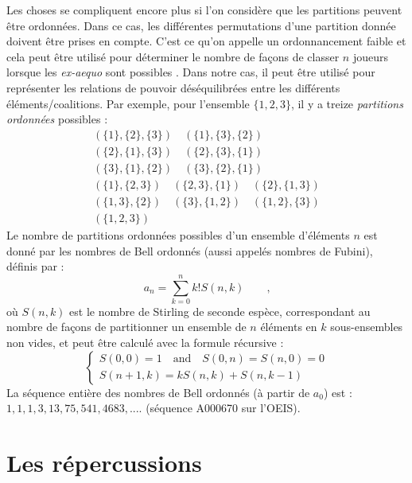Les choses se compliquent encore plus si l'on considère que les partitions peuvent être ordonnées. Dans ce cas, les différentes permutations d'une partition donnée doivent être prises en compte. C'est ce qu'on appelle un ordonnancement faible et cela peut être utilisé pour déterminer le nombre de façons de classer $n$ joueurs lorsque les \emph{ex-aequo} sont possibles \cite{Good1975}. Dans notre cas, il peut être utilisé pour représenter les relations de pouvoir déséquilibrées entre les différents éléments/coalitions. Par exemple, pour l'ensemble $\{1,2,3\}$, il y a treize \emph{partitions ordonnées} possibles :
\begin{gather*}
(\{1\},\{2\},\{3\}) \quad (\{1\},\{3\},\{2\}) \\ 
(\{2\},\{1\},\{3\}) \quad (\{2\},\{3\},\{1\}) \\ 
(\{3\},\{1\},\{2\}) \quad (\{3\},\{2\},\{1\}) \\
(\{1\},\{2,3\}) \quad (\{2,3\},\{1\}) \quad (\{2\},\{1,3\}) \\
(\{1,3\},\{2\}) \quad (\{3\},\{1,2\}) \quad (\{1,2\},\{3\}) \\
(\{1,2,3\})
\end{gather*}
Le nombre de partitions ordonnées possibles d'un ensemble d'éléments $n$ est donné par les nombres de Bell ordonnés (aussi appelés nombres de Fubini), définis par \cite{Knuth1998} :
\begin{equation}
     a_n= \sum\limits_{k=0}^n k ! S(n,k) \quad \quad \text{,}
\end{equation}
où $S(n,k)$ est le nombre de Stirling de seconde espèce, correspondant au nombre de façons de partitionner un ensemble de $n$ éléments en $k$ sous-ensembles non vides, et peut être calculé avec la formule récursive \cite{Graham1988} :
\begin{equation}
    \begin{cases}
    S(0,0) = 1 \quad \text{and} \quad S(0,n) = S(n,0) = 0\\
    S(n+1,k) = kS(n,k) + S(n,k-1)
    \end{cases}
\end{equation}
La séquence entière des nombres de Bell ordonnés (à partir de $a_0$) est : $1, 1, 1, 3, 13, 75, 541, 4683, ....$ (séquence A000670 sur l'OEIS).

\section*{Les répercussions}

